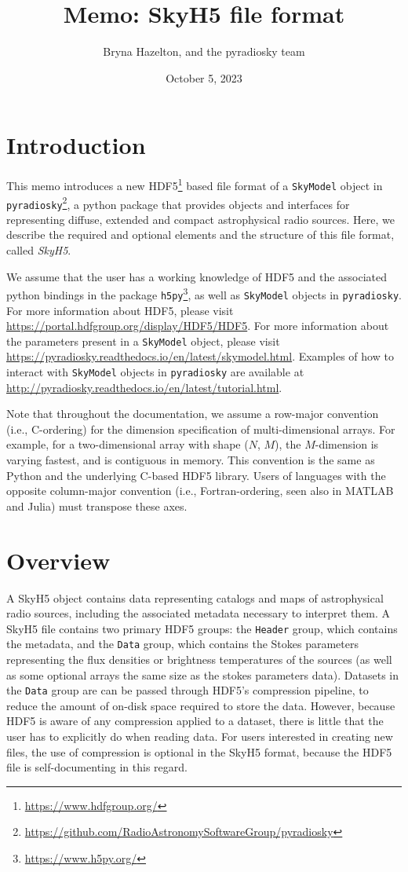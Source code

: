 \documentclass[11pt, oneside]{article}
\title{Memo: SkyH5 file format}
\author{Bryna Hazelton, and the pyradiosky team}
\date{October 5, 2023}
\begin{document}
\maketitle
\tableofcontents
\section{Introduction}
\label{sec:intro}

This memo introduces a new HDF5\footnote{\url{https://www.hdfgroup.org/}} based
file format of a \texttt{SkyModel} object in
\texttt{pyradiosky}\footnote{\url{https://github.com/RadioAstronomySoftwareGroup/pyradiosky}},
a python package that provides objects and interfaces for representing diffuse,
extended and compact astrophysical radio sources. Here, we describe the required
and optional elements and the structure of this file format, called \textit{SkyH5}.

We assume that the user has a working knowledge of HDF5 and the associated
python bindings in the package \texttt{h5py}\footnote{\url{https://www.h5py.org/}}, as
well as \texttt{SkyModel} objects in \texttt{pyradiosky}. For more information about
HDF5, please visit \url{https://portal.hdfgroup.org/display/HDF5/HDF5}. For more
information about the parameters present in a \texttt{SkyModel} object, please visit
\url{https://pyradiosky.readthedocs.io/en/latest/skymodel.html}.
Examples of how to interact with \texttt{SkyModel} objects in \texttt{pyradiosky} are
available at \url{http://pyradiosky.readthedocs.io/en/latest/tutorial.html}.

Note that throughout the documentation, we assume a row-major convention (i.e.,
C-ordering) for the dimension specification of multi-dimensional arrays. For
example, for a two-dimensional array with shape ($N$, $M$), the $M$-dimension is
varying fastest, and is contiguous in memory. This convention is the same as
Python and the underlying C-based HDF5 library. Users of languages with the
opposite column-major convention (i.e., Fortran-ordering, seen also in MATLAB
and Julia) must transpose these axes.

\section{Overview}
\label{sec:overview}
A SkyH5 object contains data representing catalogs and maps of
astrophysical radio sources, including the associated metadata necessary to interpret
them. A SkyH5 file contains two primary HDF5 groups: the \texttt{Header} group,
which contains the metadata, and the \texttt{Data} group, which contains the Stokes
parameters representing the flux densities or brightness temperatures of the sources
(as well as some optional arrays the same size as the stokes parameters data).
Datasets in the \texttt{Data} group
are can be passed through HDF5's compression
pipeline, to reduce the amount of on-disk space required to store the data.
However, because HDF5 is aware of any compression applied to a dataset, there is
little that the user has to explicitly do when reading data. For users
interested in creating new files, the use of compression is optional in the
SkyH5 format, because the HDF5 file is self-documenting in this regard.
\end{document}
